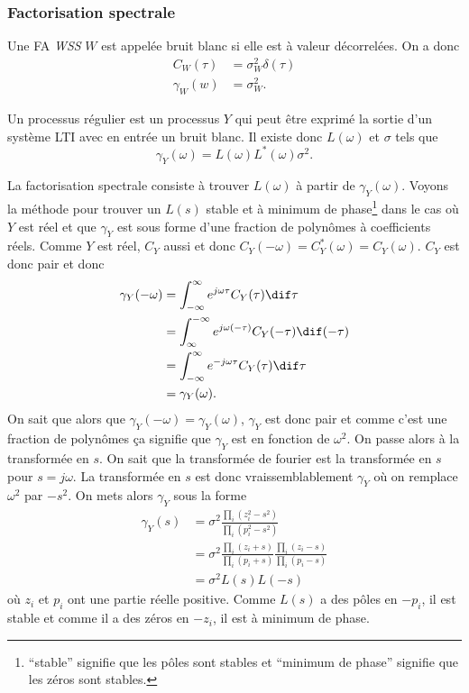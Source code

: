 
\subsubsection{Factorisation spectrale}
\begin{mydef}
  Une FA \emph{WSS} $W$ est appelée bruit blanc si elle est à valeur décorrelées.
  On a donc
  \begin{align*}
    C_W(\tau) & = \sigma_W^2 \delta(\tau)\\
    \gamma_W(w) & = \sigma_W^2.
  \end{align*}
\end{mydef}

\begin{mydef}
  Un processus régulier est un processus $Y$ qui peut être exprimé
  la sortie d'un système LTI avec en entrée un bruit blanc.
  Il existe donc $L(\omega)$ et $\sigma$ tels que
  \[ \gamma_Y(\omega) = L(\omega) L^*(\omega) \sigma^2. \]
\end{mydef}

La factorisation spectrale consiste à trouver $L(\omega)$ à partir
de $\gamma_Y(\omega)$.
Voyons la méthode pour trouver un $L(s)$ stable et à minimum de phase\footnote{
  ``stable'' signifie que les pôles sont stables et ``minimum de phase'' signifie
  que les zéros sont stables.
}
dans le cas où $Y$ est réel et que $\gamma_Y$ est sous forme d'une fraction de
polynômes à coefficients réels.
Comme $Y$ est réel, $C_Y$ aussi et donc
$C_Y(-\omega) = C_Y^*(\omega) = C_Y(\omega)$.
$C_Y$ est donc pair et donc
\begin{align*}
  \gamma_Y(-\omega) & = \int_{-\infty}^{\infty} e^{j\omega\tau} C_Y(\tau) \dif \tau\\
                    & = \int_{\infty}^{-\infty} e^{j\omega(-\tau)} C_Y(-\tau) \dif (-\tau)\\
                    & = \int_{-\infty}^{\infty} e^{-j\omega\tau} C_Y(\tau) \dif \tau\\
                    & = \gamma_Y(\omega).
\end{align*}
On sait que alors que $\gamma_Y(-\omega) = \gamma_Y(\omega)$,
$\gamma_Y$ est donc pair et comme c'est une fraction de polynômes ça signifie
que $\gamma_Y$ est en fonction de $\omega^2$.
On passe alors à la transformée en $s$.
On sait que la transformée de fourier est
la transformée en $s$ pour $s = j\omega$.
La transformée en $s$ est donc vraissemblablement $\gamma_Y$ où on remplace
$\omega^2$ par $-s^2$.
On mets alors $\gamma_Y$ sous la forme
\begin{align*}
  \gamma_Y(s) & = \sigma^2\frac{\prod_i (z_i^2-s^2)}{\prod_i (p_i^2-s^2)}\\
              & = \sigma^2\frac{\prod_i (z_i+s)}{\prod_i (p_i+s)}\frac{\prod_i (z_i-s)}{\prod_i (p_i-s)}\\
              & = \sigma^2 L(s) L(-s)
\end{align*}
où $z_i$ et $p_i$ ont une partie réelle positive.
Comme $L(s)$ a des pôles en $-p_i$, il est stable et comme il
a des zéros en $-z_i$, il est à minimum de phase.

